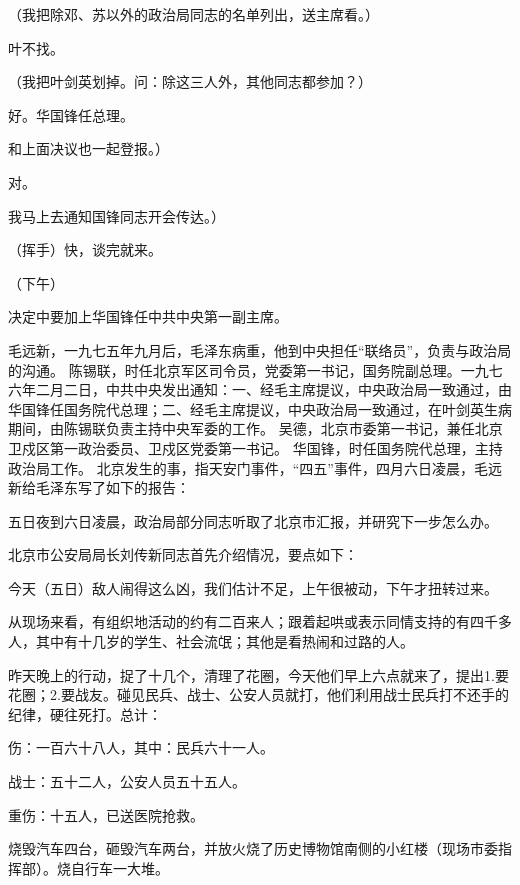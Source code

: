 （我把除邓、苏以外的政治局同志的名单列出，送主席看。）

叶不找。

（我把叶剑英划掉。问：除这三人外，其他同志都参加？）

好。华国锋任总理。

和上面决议也一起登报。）

对。

我马上去通知国锋同志开会传达。）

（挥手）快，谈完就来。

（下午）

决定中要加上华国锋任中共中央第一副主席。

\begin{maonote}
毛远新，一九七五年九月后，毛泽东病重，他到中央担任“联络员”，负责与政治局的沟通。
陈锡联，时任北京军区司令员，党委第一书记，国务院副总理。一九七六年二月二日，中共中央发出通知：一、经毛主席提议，中央政治局一致通过，由华国锋任国务院代总理；二、经毛主席提议，中央政治局一致通过，在叶剑英生病期间，由陈锡联负责主持中央军委的工作。
吴德，北京市委第一书记，兼任北京卫戍区第一政治委员、卫戍区党委第一书记。
华国锋，时任国务院代总理，主持政治局工作。
北京发生的事，指天安门事件，“四五”事件，四月六日凌晨，毛远新给毛泽东写了如下的报告：


五日夜到六日凌晨，政治局部分同志听取了北京市汇报，并研究下一步怎么办。

北京市公安局局长刘传新同志首先介绍情况，要点如下：

今天（五日）敌人闹得这么凶，我们估计不足，上午很被动，下午才扭转过来。

从现场来看，有组织地活动的约有二百来人；跟着起哄或表示同情支持的有四千多人，其中有十几岁的学生、社会流氓；其他是看热闹和过路的人。

昨天晚上的行动，捉了十几个，清理了花圈，今天他们早上六点就来了，提出1.要花圈；2.要战友。碰见民兵、战士、公安人员就打，他们利用战士民兵打不还手的纪律，硬往死打。总计：

伤：一百六十八人，其中：民兵六十一人。

战士：五十二人，公安人员五十五人。

重伤：十五人，已送医院抢救。

烧毁汽车四台，砸毁汽车两台，并放火烧了历史博物馆南侧的小红楼（现场市委指挥部）。烧自行车一大堆。


\end{maonote}
